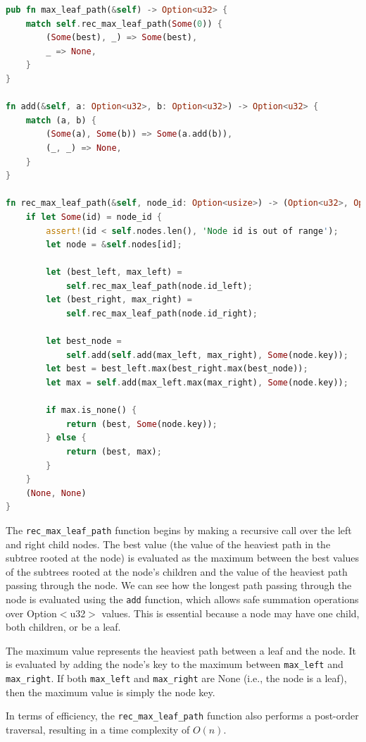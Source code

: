 \documentclass[a4paper,12pt]{article}
\begin{document}
\begin{lstlisting}[language=Rust, style=boxed, caption=The \texttt{max\_leaf\_path} Function]
pub fn max_leaf_path(&self) -> Option<u32> {
    match self.rec_max_leaf_path(Some(0)) {
        (Some(best), _) => Some(best),
        _ => None,
    }
}

fn add(&self, a: Option<u32>, b: Option<u32>) -> Option<u32> {
    match (a, b) {
        (Some(a), Some(b)) => Some(a.add(b)),
        (_, _) => None,
    }
}

fn rec_max_leaf_path(&self, node_id: Option<usize>) -> (Option<u32>, Option<u32>) {
    if let Some(id) = node_id {
        assert!(id < self.nodes.len(), 'Node id is out of range');
        let node = &self.nodes[id];

        let (best_left, max_left) = 
            self.rec_max_leaf_path(node.id_left);
        let (best_right, max_right) = 
            self.rec_max_leaf_path(node.id_right);

        let best_node = 
            self.add(self.add(max_left, max_right), Some(node.key));
        let best = best_left.max(best_right.max(best_node));
        let max = self.add(max_left.max(max_right), Some(node.key));

        if max.is_none() {
            return (best, Some(node.key));
        } else {
            return (best, max);
        }
    }
    (None, None)
}
\end{lstlisting}

The \texttt{rec\_max\_leaf\_path} function begins by making a recursive call over the left and right child nodes. The best value (the value of the heaviest path in the subtree rooted at the node) is evaluated as the maximum between the best values of the subtrees rooted at the node's children and the value of the heaviest path passing through the node.
We can see how the longest path passing through the node is evaluated using the \texttt{add} function, which allows safe summation operations over Option$<$u32$>$ values.
This is essential because a node may have one child, both children, or be a leaf.

The maximum value represents the heaviest path between a leaf and the node. It is evaluated by adding the node's key to the maximum between \texttt{max\_left} and \texttt{max\_right}. If both \texttt{max\_left} and \texttt{max\_right} are None (i.e., the node is a leaf), then the maximum value is simply the node key.

In terms of efficiency, the \texttt{rec\_max\_leaf\_path} function also performs a post-order traversal, resulting in a time complexity of \(O(n)\).
\end{document}
